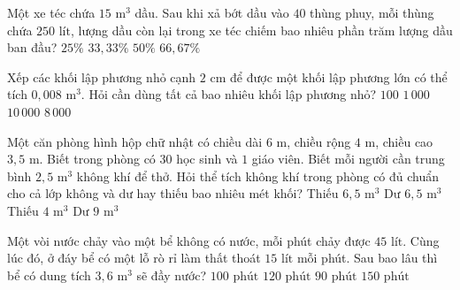 \begin{ex} %
Một xe téc chứa $15\text{ m}^3$ dầu. Sau khi xả bớt dầu vào $40$ thùng phuy, mỗi thùng chứa $250\text{ lít}$, lượng dầu còn lại trong xe téc chiếm bao nhiêu phần trăm lượng dầu ban đầu?
\choice
{$25\%$}
{\True $33{,}33\%$}
{$50\%$}
{$66{,}67\%$}
\end{ex}

\begin{ex} %
Xếp các khối lập phương nhỏ cạnh $2\text{ cm}$ để được một khối lập phương lớn có thể tích $0{,}008\text{ m}^3$. Hỏi cần dùng tất cả bao nhiêu khối lập phương nhỏ?
\choice
{$100$}
{\True $1\,000$}
{$10\,000$}
{$8\,000$}
\end{ex}

\begin{ex} %
Một căn phòng hình hộp chữ nhật có chiều dài $6\text{ m}$, chiều rộng $4\text{ m}$, chiều cao $3{,}5\text{ m}$. Biết trong phòng có $30$ học sinh và $1$ giáo viên. Biết mỗi người cần trung bình $2{,}5\text{ m}^3$ không khí để thở. Hỏi thể tích không khí trong phòng có đủ chuẩn cho cả lớp không và dư hay thiếu bao nhiêu mét khối?
\choice
{Thiếu $6{,}5\text{ m}^3$}
{\True Dư $6{,}5\text{ m}^3$}
{Thiếu $4\text{ m}^3$}
{Dư $9\text{ m}^3$}
\end{ex}

\begin{ex} %
Một vòi nước chảy vào một bể không có nước, mỗi phút chảy được $45\text{ lít}$. Cùng lúc đó, ở đáy bể có một lỗ rò rỉ làm thất thoát $15\text{ lít}$ mỗi phút. Sau bao lâu thì bể có dung tích $3{,}6\text{ m}^3$ sẽ đầy nước?
\choice
{$100\text{ phút}$}
{\True $120\text{ phút}$}
{$90\text{ phút}$}
{$150\text{ phút}$}
\end{ex}

